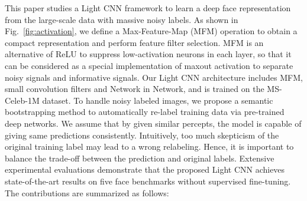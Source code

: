 \documentclass[journal,transmag]{IEEEtran}
\begin{document}
This paper studies a Light CNN framework to learn a deep face representation from the large-scale data with massive noisy labels. As shown in Fig.~\ref{fig:activation}, we define a Max-Feature-Map (MFM) operation to obtain a compact representation and perform feature filter selection. MFM is an alternative of ReLU to suppress low-activation neurons in each layer, so that it can be considered as a special implementation of maxout activation \cite{goodfellow2013maxout} to separate noisy signals and informative signals. Our Light CNN architecture includes MFM, small convolution filters and Network in Network, and is trained on the MS-Celeb-1M dataset. To handle noisy labeled images, we propose a semantic bootstrapping method to automatically re-label training data via pre-trained deep networks. We assume that by given similar percepts, the model is capable of giving same predictions consistently.
Intuitively, too much skepticism of the original training label may lead to a wrong relabeling. Hence, it is important to balance the trade-off between the prediction and original labels. Extensive experimental evaluations demonstrate that the proposed Light CNN achieves state-of-the-art results on five face benchmarks without supervised fine-tuning. The contributions are summarized as follows:
\end{document}
